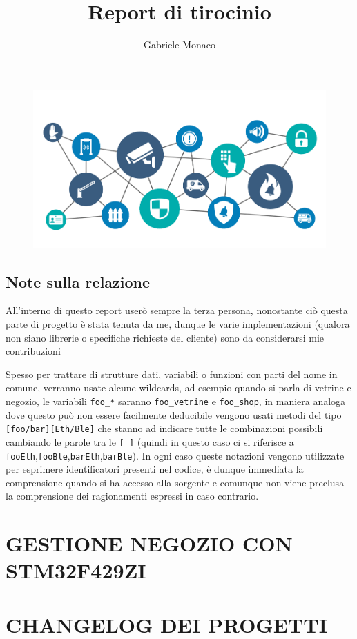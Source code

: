 \documentclass[a4paper,12pt]{article}
\title{Report di tirocinio}
\author{Gabriele Monaco}
\begin{document}
\maketitle

\begin{figure}[h]
  \includegraphics[width=\textwidth]{header}
\end{figure}

\newpage

\tableofcontents

\setlength{\parindent}{0pt}

\newpage

\begin{em}

  \subsection{Note sulla relazione}

  All'interno di questo report user\`o sempre la terza persona, nonostante ci\`o questa parte di progetto \`e stata tenuta da me, dunque le varie implementazioni (qualora non siano librerie o specifiche richieste del cliente) sono da considerarsi mie contribuzioni

  Spesso per trattare di strutture dati, variabili o funzioni con parti del nome in comune, verranno usate alcune wildcards, ad esempio quando si parla di vetrine e negozio, le variabili \textup{\texttt{foo\_*}} saranno \textup{\texttt{foo\_vetrine}} e \textup{\texttt{foo\_shop}}, in maniera analoga dove questo pu\`o non essere facilmente deducibile vengono usati metodi del tipo \textup{\texttt{[foo/bar][Eth/Ble]}} che stanno ad indicare tutte le combinazioni possibili cambiando le parole tra le \textup{\texttt{[ ]}} (quindi in questo caso ci si riferisce a \textup{\texttt{fooEth}},\textup{\texttt{fooBle}},\textup{\texttt{barEth}},\textup{\texttt{barBle}}). In ogni caso queste notazioni vengono utilizzate per esprimere identificatori presenti nel codice, \`e dunque immediata la comprensione quando si ha accesso alla sorgente e comunque non viene preclusa la comprensione dei ragionamenti espressi in caso contrario.

\end{em}

\section{GESTIONE NEGOZIO CON STM32F429ZI}



\newpage

\section{CHANGELOG DEI PROGETTI}


\end{document}
